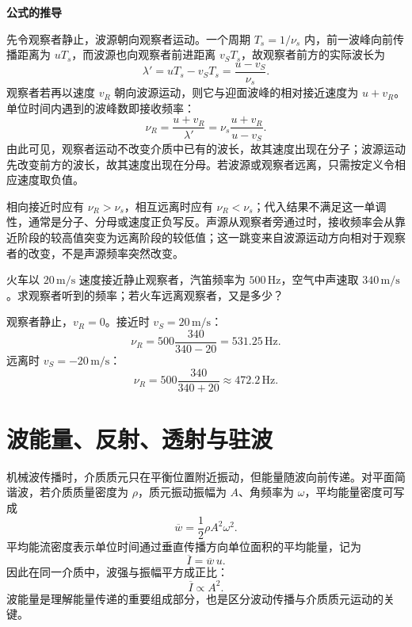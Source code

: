 \textbf{公式的推导}

先令观察者静止，波源朝向观察者运动。一个周期 $T_s=1/\nu_s$ 内，前一波峰向前传播距离为 $uT_s$，而波源也向观察者前进距离 $v_ST_s$，故观察者前方的实际波长为
\[
  \lambda'=uT_s-v_ST_s=\frac{u-v_S}{\nu_s}.
\]
观察者若再以速度 $v_R$ 朝向波源运动，则它与迎面波峰的相对接近速度为 $u+v_R$。单位时间内遇到的波峰数即接收频率：
\[
  \nu_R=\frac{u+v_R}{\lambda'}
  =\nu_s\frac{u+v_R}{u-v_S}.
\]
由此可见，观察者运动不改变介质中已有的波长，故其速度出现在分子；波源运动先改变前方的波长，故其速度出现在分母。若波源或观察者远离，只需按定义令相应速度取负值。

\begin{attention}[多普勒效应的判号检查]
相向接近时应有 $\nu_R>\nu_s$，相互远离时应有 $\nu_R<\nu_s$；代入结果不满足这一单调性，通常是分子、分母或速度正负写反。声源从观察者旁通过时，接收频率会从靠近阶段的较高值突变为远离阶段的较低值；这一跳变来自波源运动方向相对于观察者的改变，不是声源频率突然改变。
\end{attention}

\begin{example}[title={火车鸣笛的多普勒效应}]\label{eg:doppler-example}
火车以 $20\,\mathrm{m/s}$ 速度接近静止观察者，汽笛频率为 $500\,\mathrm{Hz}$，空气中声速取 $340\,\mathrm{m/s}$。求观察者听到的频率；若火车远离观察者，又是多少？

\begin{solution}
观察者静止，$v_R=0$。接近时 $v_S=20\,\mathrm{m/s}$：
\[
  \nu_R=500\frac{340}{340-20}
  =531.25\,\mathrm{Hz}.
\]
远离时 $v_S=-20\,\mathrm{m/s}$：
\[
  \nu_R=500\frac{340}{340+20}
  \approx472.2\,\mathrm{Hz}.
\]
\end{solution}
\end{example}

\section{波能量、反射、透射与驻波}

\begin{definition}[波的能量与平均能流密度]\label{def:wave-energy-note}
机械波传播时，介质质元只在平衡位置附近振动，但能量随波向前传递。对平面简谐波，若介质质量密度为 $\rho$，质元振动振幅为 $A$、角频率为 $\omega$，平均能量密度可写成
\[
  \overline w=\frac12\rho A^2\omega^2.
\]
平均能流密度表示单位时间通过垂直传播方向单位面积的平均能量，记为
\[
  \overline I=\overline w\,u.
\]
因此在同一介质中，波强与振幅平方成正比：
\[
  \overline I\propto A^2.
\]
波能量是理解能量传递的重要组成部分，也是区分波动传播与介质质元运动的关键。
\end{definition}

